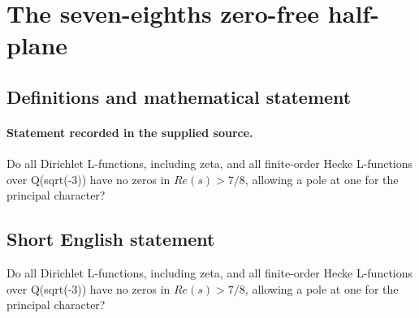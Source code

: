 \documentclass[11pt]{article}
\begin{document}
\section*{The seven-eighths zero-free half-plane}\label{statement}
\subsection{Definitions and mathematical statement}
\paragraph{Statement recorded in the supplied source.}
Do all Dirichlet L-functions, including zeta, and all finite-order Hecke L-functions over Q(sqrt(-3)) have no zeros in $Re(s)>7/8$, allowing a pole at one for the principal character?
\subsection{Short English statement}
Do all Dirichlet L-functions, including zeta, and all finite-order Hecke L-functions over Q(sqrt(-3)) have no zeros in $Re(s)>7/8$, allowing a pole at one for the principal character?
\end{document}
